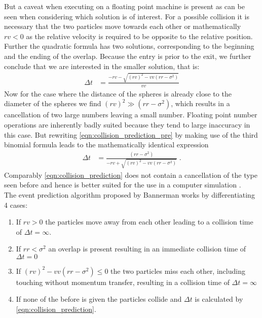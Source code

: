 But a caveat when executing on a floating point machine is present as can be seen when considering which solution is of interest. For a possible collision it is necessary that the two particles move towards each other or mathematically $rv<0$ as the relative velocity is required to be opposite to the relative position.\\

Further the quadratic formula has two solutions, corresponding to the beginning and the ending of the overlap. Because the entry is prior to the exit, we further conclude that we are interested in the smaller solution, that is:
\begin{align}
\label{eqn:collision_prediction_pre}
\Delta t &= \frac{ - rv - \sqrt{ (rv)^2  - vv (rr - \sigma^2 )} }{vv}
\end{align}
Now for the case where the distance of the spheres is already close to the diameter of the spheres we find $(rv)^2 \gg (rr-\sigma^2)$, which results in a cancellation of two large numbers leaving a small number. Floating point number operations are inherently badly suited because they tend to large inaccuracy in this case. But rewriting \autoref{eqn:collision_prediction_pre} by making use of the third binomial formula leads to the mathematically identical expression
\begin{align}
\label{eqn:collision_prediction}
\Delta t &= \frac{(rr - \sigma^2 )}{ - rv + \sqrt{ (rv)^2  - vv (rr - \sigma^2 )}} \; \text{.}
\end{align}
Comparably \autoref{eqn:collision_prediction} does not contain a cancellation of the type seen before and hence is better suited for the use in a computer simulation \cite{Goldberg1991}. \\

The event prediction algorithm proposed by Bannerman\cite{Bannerman2014} works by differentiating 4 cases:
\begin{enumerate}
\item If $rv>0$ the particles move away from each other leading to a collision time of $\Delta t = \infty$.
\item If $rr<\sigma^2$ an overlap is present resulting in an immediate collision time of $\Delta t = 0$
\item If $(rv)^2  - vv (rr - \sigma^2 ) \leq 0 $ the two particles miss each other, including touching without momentum transfer, resulting in a collision time of $\Delta t = \infty$
\item If none of the before is given the particles collide and $\Delta t$ is calculated by \autoref{eqn:collision_prediction}.
\end{enumerate}

